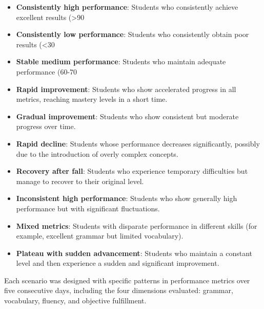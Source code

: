 \begin{itemize}
    \item \textbf{Consistently high performance}: Students who consistently achieve excellent results (>90%
    
    \item \textbf{Consistently low performance}: Students who consistently obtain poor results (<30%
    
    \item \textbf{Stable medium performance}: Students who maintain adequate performance (60-70%
    
    \item \textbf{Rapid improvement}: Students who show accelerated progress in all metrics, reaching mastery levels in a short time.
    
    \item \textbf{Gradual improvement}: Students who show consistent but moderate progress over time.
    
    \item \textbf{Rapid decline}: Students whose performance decreases significantly, possibly due to the introduction of overly complex concepts.
    
    \item \textbf{Recovery after fall}: Students who experience temporary difficulties but manage to recover to their original level.
    
    \item \textbf{Inconsistent high performance}: Students who show generally high performance but with significant fluctuations.
    
    \item \textbf{Mixed metrics}: Students with disparate performance in different skills (for example, excellent grammar but limited vocabulary).
    
    \item \textbf{Plateau with sudden advancement}: Students who maintain a constant level and then experience a sudden and significant improvement.
\end{itemize}

Each scenario was designed with specific patterns in performance metrics over five consecutive days, including the four dimensions evaluated: grammar, vocabulary, fluency, and objective fulfillment.

